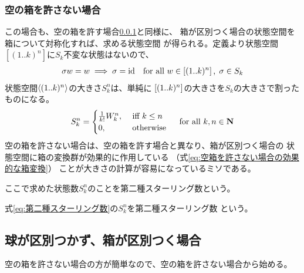 		\subsubsection{空の箱を許さない場合}\label{s3:空の箱を許さない場合} %
			この場合も、空の箱を許す場合\ref{s3:空の箱を許さない場合}と同様に、
			箱が区別つく場合の状態空間を箱について対称化すれば、求める状態空間
			が得られる。定義より状態空間$[(1..k)^n]$に$S_k$不変な状態はないので、
			\begin{equation}\label{eq:空箱を許さない場合の効果的な箱変換}\begin{split} %
				\sigma w = w \implies \sigma = \myid
				\quad\text{for all }w\in\bakko{(1..k)^n},\;\sigma\in S_k
			\end{split}\end{equation} %
			状態空間$\mathinner{\langle{(1..k)^n}\rangle}$の大きさ$S_k^n$は、単純に
			$\left[{(1..k)^n}\right]$の大きさを$S_k$の大きさで割ったものになる。
			\begin{equation}\label{eq:第二種スターリング数}\begin{split} %
				S_k^n = \begin{cases}
					\frac{1}{k!}W_k^n, &\text{ iff }k\le n \\
					0, &\text{ otherwise } \\
				\end{cases} \quad\text{for all }k,n\in \mybf{N}
			\end{split}\end{equation} %
			空の箱を許さない場合は、空の箱を許す場合と異なり、箱が区別つく場合の
			状態空間に箱の変換群が効果的に作用している
			（式\eqref{eq:空箱を許さない場合の効果的な箱変換}）
			ことが大きさの計算が容易になっているミソである。

			ここで求めた状態数$S_k^n$のことを第二種スターリング数という。

			\begin{definition}\label{def:第二種スターリング数} %
				式\eqref{eq:第二種スターリング数}の$S_k^n$を第二種スターリング数
				という。
			\end{definition} %

	\subsection{球が区別つかず、箱が区別つく場合}\label{s2:球が区別つかず、箱が区別つく場合} %
		空の箱を許さない場合の方が簡単なので、空の箱を許さない場合から始める。
